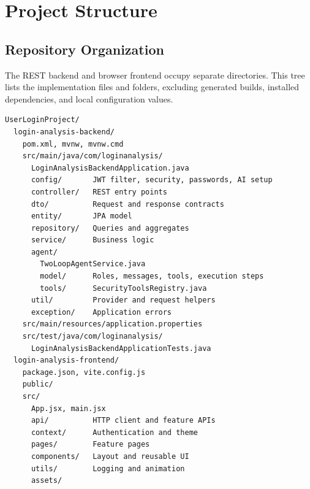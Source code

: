 \chapter{Project Structure}
\section{Repository Organization}
The REST backend and browser frontend occupy separate directories. This tree lists the implementation files and folders, excluding generated builds, installed dependencies, and local configuration values.
\begingroup\footnotesize{}
\begin{lstlisting}[basicstyle=\ttfamily\scriptsize]
UserLoginProject/
  login-analysis-backend/
    pom.xml, mvnw, mvnw.cmd
    src/main/java/com/loginanalysis/
      LoginAnalysisBackendApplication.java
      config/       JWT filter, security, passwords, AI setup
      controller/   REST entry points
      dto/          Request and response contracts
      entity/       JPA model
      repository/   Queries and aggregates
      service/      Business logic
      agent/
        TwoLoopAgentService.java
        model/      Roles, messages, tools, execution steps
        tools/      SecurityToolsRegistry.java
      util/         Provider and request helpers
      exception/    Application errors
    src/main/resources/application.properties
    src/test/java/com/loginanalysis/
      LoginAnalysisBackendApplicationTests.java
  login-analysis-frontend/
    package.json, vite.config.js
    public/
    src/
      App.jsx, main.jsx
      api/          HTTP client and feature APIs
      context/      Authentication and theme
      pages/        Feature pages
      components/   Layout and reusable UI
      utils/        Logging and animation
      assets/
\end{lstlisting}
\endgroup


